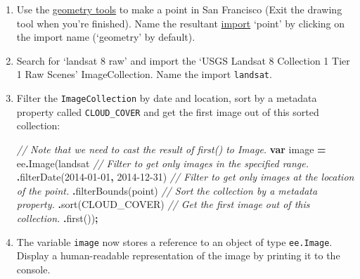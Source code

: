 \documentclass[
]{article}
\newenvironment{Shaded}{\begin{snugshade}}{\end{snugshade}}
\newcommand{\CommentTok}[1]{\textcolor[rgb]{0.56,0.35,0.01}{\textit{#1}}}
\newcommand{\FunctionTok}[1]{\textcolor[rgb]{0.00,0.00,0.00}{#1}}
\newcommand{\KeywordTok}[1]{\textcolor[rgb]{0.13,0.29,0.53}{\textbf{#1}}}
\newcommand{\NormalTok}[1]{#1}
\newcommand{\OperatorTok}[1]{\textcolor[rgb]{0.81,0.36,0.00}{\textbf{#1}}}
\newcommand{\StringTok}[1]{\textcolor[rgb]{0.31,0.60,0.02}{#1}}
\begin{document}
\begin{enumerate}
\def\labelenumi{\alph{enumi}.}
\setcounter{enumi}{1}
\item
  Use the \href{https://developers.google.com/earth-engine/playground\#geometry-tools}{geometry tools} to make a point in San Francisco (Exit the drawing tool when you're finished). Name the resultant \href{https://developers.google.com/earth-engine/playground\#imports}{import} `point' by clicking on the import name (`geometry' by default).
\item
  Search for `landsat 8 raw' and import the `USGS Landsat 8 Collection 1 Tier 1 Raw Scenes' ImageCollection. Name the import \texttt{landsat}.
\item
  Filter the \texttt{ImageCollection} by date and location, sort by a metadata property called \texttt{CLOUD\_COVER} and get the first image out of this sorted collection:

\begin{Shaded}
\begin{Highlighting}[]
\CommentTok{//  Note that we need to cast the result of first() to Image.   }
\KeywordTok{var}\NormalTok{ image }\OperatorTok{=}\NormalTok{ ee}\OperatorTok{.}\FunctionTok{Image}\NormalTok{(landsat        }
                     \CommentTok{//  Filter to get only images in the specified range.  }
                     \OperatorTok{.}\FunctionTok{filterDate}\NormalTok{(}\StringTok{\textquotesingle{}2014{-}01{-}01\textquotesingle{}}\OperatorTok{,}  \StringTok{\textquotesingle{}2014{-}12{-}31\textquotesingle{}}\NormalTok{)        }
                     \CommentTok{//  Filter to get only images at the location of the point.     }
                     \OperatorTok{.}\FunctionTok{filterBounds}\NormalTok{(point)        }
                     \CommentTok{//  Sort the collection by a metadata property.     }
                     \OperatorTok{.}\FunctionTok{sort}\NormalTok{(}\StringTok{\textquotesingle{}CLOUD\_COVER\textquotesingle{}}\NormalTok{)        }
                     \CommentTok{//  Get the first image out of this collection.     }
                     \OperatorTok{.}\FunctionTok{first}\NormalTok{())}\OperatorTok{;}  
\end{Highlighting}
\end{Shaded}
\item
  The variable \texttt{image} now stores a reference to an object of type \texttt{ee.Image}. Display a human-readable representation of the image by printing it to the console.


\end{enumerate}
\end{document}

